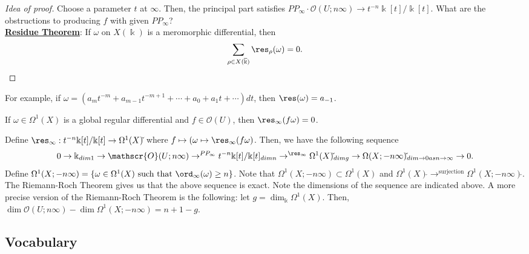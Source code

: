 \begin{proof}[Idea of proof]
Choose a parameter $t$ at $\infty$.  Then, the principal part satisfies $PP_{\infty} \cdot \mathscr{O}(U;n\infty) \to t^{-n}\Bbbk[t]/\Bbbk[t]$.  What are the obstructions to producing $f$ with given $PP_{\infty}$?\\
\indent \underline{\textbf{Residue Theorem}}:  If $\omega$ on $X(\Bbbk)$ is a meromorphic differential, then
\begin{equation*}
\sum_{\rho \in X(\overline{\Bbbk})} \res_{\rho}(\omega)=0.
\end{equation*}
\end{proof}
For example, if $\omega=(a_{m}t^{-m}+a_{m-1}t^{-m+1}+\dotsb+a_{0}+a_{1}t+\dotsb)dt$, then $\res(\omega)=a_{-1}$.
\begin{corollary}
If $\omega \in \Omega^{1}(X)$ is a global regular differential and $f \in \mathscr{O}(U)$, then $\res_{\infty}(f\omega)=0$.
\end{corollary}
Define $\res_{\infty}: t^{-n}\Bbbk[t]/\Bbbk[t] \to \Omega^{1}(X)\check{}$ where $f \mapsto (\omega \mapsto \res_{\infty}(f\omega)$.  Then, we have the following sequence
\begin{equation*}
0 \to \Bbbk_{dim 1} \to \mathscr{O}(U;n\infty) \to^{PP_{\infty}} t^{-n}\Bbbk[t]/\Bbbk[t]_{dim n} \to^{\res_{\infty}} \Omega^{1}(X)\check{}_{dim g} \to \Omega(X;-n\infty)\check{}_{dim \to 0 as n \to \infty} \to 0.
\end{equation*}
Define $\Omega^{1}(X;-n\infty)=\{\omega \in \Omega^{1}(X) \text{ such that } \ord_{\infty}(\omega) \ge n\}$.  Note that $\Omega^{1}(X;-n\infty) \subset \Omega^{1}(X)$ and $\Omega^{1}(X)\check{} \to^{\text{surjection}} \Omega^{1}(X;-n\infty)\check{}$.  The Riemann-Roch Theorem gives us that the above sequence is exact.  Note the dimensions of the sequence are indicated above.  A more precise version of the Riemann-Roch Theorem is the following:  let $g=\dim_{\Bbbk} \Omega^{1}(X)$.  Then, $\dim \mathscr{O}(U;n\infty)-\dim \Omega^{1}(X;-n\infty)=n+1-g$.

\subsection{Vocabulary}

